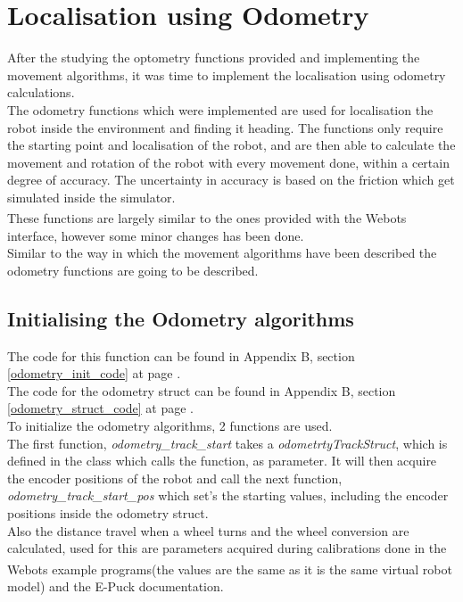 \section{Localisation using Odometry}
After the studying the optometry functions provided and implementing the movement algorithms, it was time to implement the localisation using odometry calculations.\\
The odometry functions which were implemented are used for localisation the robot inside the environment and finding it heading. The functions only require the starting point and localisation of the robot, and are then able to calculate the movement and rotation of the robot with every movement done, within a certain degree of accuracy. The uncertainty in accuracy is based on the friction which get simulated inside the simulator. \\
These functions are largely similar to the ones provided with the Webots\textsuperscript{\texttrademark} interface, however some minor changes has been done. \\
Similar to the way in which the movement algorithms have been described the odometry functions are going to be described.

\subsection{Initialising the Odometry algorithms}
\label{odometry_init_description}
The code for this function can be found in Appendix B, section \ref{odometry_init_code} at page \pageref{odometry_init_code}.\\
The code for the odometry struct can be found in Appendix B, section \ref{odometry_struct_code} at page \pageref{odometry_struct_code}.\\
To initialize the odometry algorithms, 2 functions are used. \\
The first function, \textit{odometry\_track\_start} takes a \textit{odometrtyTrackStruct}, which is defined in the class which calls the function, as parameter. It will then acquire the encoder positions of the robot and call the next function, \textit{odometry\_track\_start\_pos} which set's the starting values, including the encoder positions inside the odometry struct.\\[3ex]


Also the distance travel when a wheel turns and the wheel conversion are calculated, used for this are parameters acquired during calibrations done in the Webots \textsuperscript{\texttrademark} example programs(the values are the same as it is the same virtual robot model) and the E-Puck documentation.

